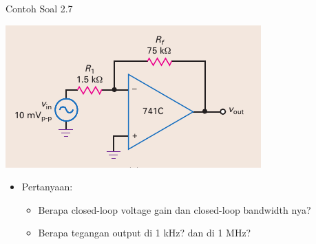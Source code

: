 \begin{frame}[t]{Contoh Soal 2.7}
	\begin{multicols}{2}
		\begin{center}
			\includegraphics[width=0.7\linewidth]{gambar/fig-16.16a}
		\end{center}
		\columnbreak
		\begin{itemize}
			\item Pertanyaan:
			\begin{itemize}
				\item Berapa closed-loop voltage gain dan closed-loop bandwidth nya?
				\item Berapa tegangan output di 1 kHz? dan di 1 MHz?
			\end{itemize}
		\end{itemize}
	\end{multicols}
\end{frame}


